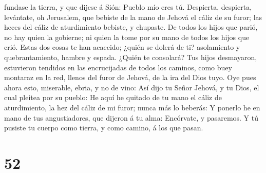 fundase la tierra, y que dijese á Sión: Pueblo mío eres tú.
 Despierta, despierta, levántate, oh Jerusalem, que bebiste
de la mano de Jehová el cáliz de su furor; las heces del cáliz de
aturdimiento bebiste, y chupaste.  De todos los hijos que
parió, no hay quien la gobierne; ni quien la tome por su mano de todos
los hijos que crió.  Estas dos cosas te han acaecido;
¿quién se dolerá de ti? asolamiento y quebrantamiento, hambre y espada.
¿Quién te consolará?  Tus hijos desmayaron, estuvieron
tendidos en las encrucijadas de todos los caminos, como buey montaraz en
la red, llenos del furor de Jehová, de la ira del Dios tuyo.
 Oye pues ahora esto, miserable, ebria, y no de vino:
 Así dijo tu Señor Jehová, y tu Dios, el cual pleitea por
su pueblo: He aquí he quitado de tu mano el cáliz de aturdimiento, la
hez del cáliz de mi furor; nunca más lo beberás:  Y ponerlo
he en mano de tus angustiadores, que dijeron á tu alma: Encórvate, y
pasaremos. Y tú pusiste tu cuerpo como tierra, y como camino, á los que
pasan.

\hypertarget{section-51}{%
\section{52}\label{section-51}}

